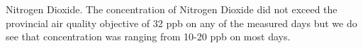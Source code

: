 
    


 

    
    
    
    
    Nitrogen Dioxide. The concentration of 
    Nitrogen Dioxide did not exceed the provincial air quality objective of 32 ppb on any of the measured days but we do see that concentration  was ranging from 10-20 ppb on most days.


